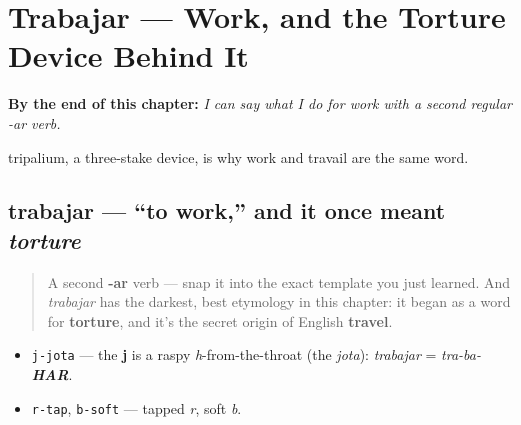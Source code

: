 
\chapter{Trabajar --- Work, and the Torture Device Behind It}
\label{ch:spanish-trabajar}

\begin{chapteropening}
\textbf{By the end of this chapter:} \emph{I can say what I do for work with a second regular -ar verb.}

tripalium, a three-stake device, is why work and travail are the same word.
\end{chapteropening}

\section[trabajar]{trabajar — \textquotedblleft{}to work,\textquotedblright{} and it once meant \emph{torture}}

\label{lesson:ES-C06-trabajar}



\begin{quote}
A second \textbf{-ar} verb — snap it into the exact template you just learned. And \emph{trabajar} has the darkest, best etymology in this chapter: it began as a word for \textbf{torture}, and it's the secret origin of English \textbf{travel}.
\end{quote}

\begin{sounds}
\begin{itemize}
\raggedright
  \item \texttt{j-jota} — the \textbf{j} is a raspy \emph{h}-from-the-throat (the \emph{jota}): \emph{trabajar} = \emph{tra-ba-\textbf{HAR}}.
  \item \texttt{r-tap}, \texttt{b-soft} — tapped \emph{r}, soft \emph{b}.
\end{itemize}
\end{sounds}

